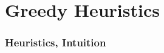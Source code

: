 \documentclass[xcolor=dvipsnames]{beamer}
\begin{document}
\section{Greedy Heuristics}
\begin{frame}
\frametitle{Heuristics, Intuition}
\begin{minipage}{0.30\textwidth}
\begin{overlayarea}{\textwidth}{0.5\textheight}
% 
% 
\end{overlayarea}%
\end{minipage}%
\begin{minipage}{0.70\textwidth} 

\end{minipage}
\end{frame}
\end{document}
